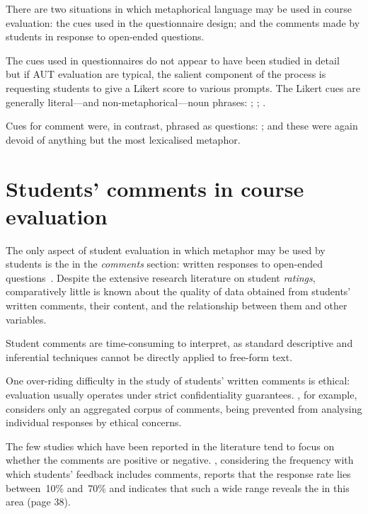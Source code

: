 There are two situations in which metaphorical language may be used in
course evaluation: the cues used in the questionnaire design; and the
comments made by students in response to open-ended questions.

The cues used in questionnaires do not appear to have been studied in
detail~\citep{aleamoni1980} but if AUT evaluation are typical, the
salient component of the process is requesting students to give a
Likert score to various prompts.  The Likert cues are generally
literal---and non-metaphorical---noun phrases: ; ; .

Cues for comment were, in contrast, phrased as questions: ;  and these were again devoid
of anything but the most lexicalised metaphor.

\section{Students' comments in course evaluation}

The only aspect of student evaluation in which metaphor may be used by
students is the in the \emph{comments} section: written responses to
open-ended questions~\citep{stewart2015}.  Despite the extensive
research literature on student \emph{ratings}, comparatively little is
known about the quality of data obtained from students' written
comments, their content, and the relationship between them and other
variables.

Student comments are time-consuming to interpret, as standard
descriptive and inferential techniques cannot be directly applied to
free-form text.

One over-riding difficulty in the study of students' written comments
is ethical: evaluation usually operates under strict confidentiality
guarantees.  , for example, considers only an
aggregated corpus of comments, being prevented from analysing
individual responses by ethical concerns.

The few studies which have been reported in the literature tend to
focus on whether the comments are positive or negative.  
, considering the frequency with which students'
feedback includes comments, reports that the response rate lies
between~10\% and~70\% and indicates that such a wide range reveals the
 in this area (page 38).

